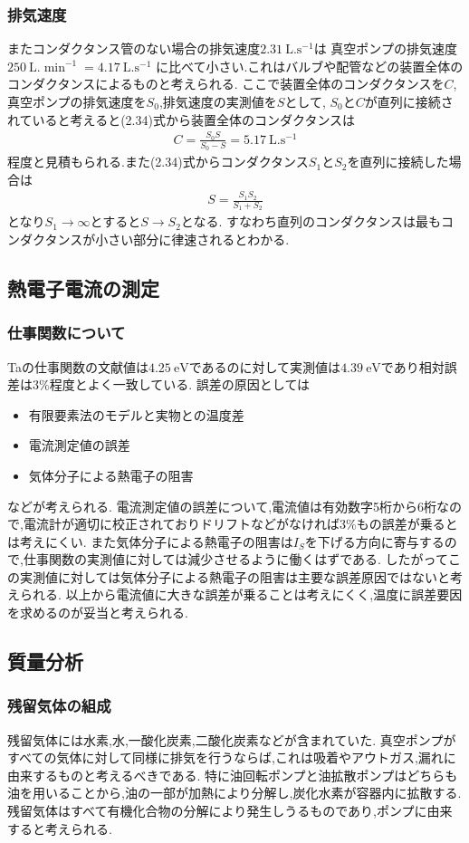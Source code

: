\subsubsection{排気速度}
またコンダクタンス管のない場合の排気速度$2.31\ \si{\liter.\second^{-1}}$は
真空ポンプの排気速度$250\ \si{\liter.\min^{-1}}=4.17\ \si{\liter.\second^{-1}}$
に比べて小さい.これはバルブや配管などの装置全体のコンダクタンスによるものと考えられる.
ここで装置全体のコンダクタンスを$C$,真空ポンプの排気速度を$S_0$,排気速度の実測値を$S$として,
$S_0$と$C$が直列に接続されていると考えると(2.34)式から装置全体のコンダクタンスは
\begin{align}
  C=\frac{S_0S}{S_0-S}=5.17\ \si{\liter.\second^{-1}}
\end{align}
程度と見積もられる.また(2.34)式からコンダクタンス$S_1$と$S_2$を直列に接続した場合は
\begin{align}
  S=\frac{S_1S_2}{S_1+S_2}
\end{align}
となり$S_1\rightarrow\infty$とすると$S\rightarrow S_2$となる.
すなわち直列のコンダクタンスは最もコンダクタンスが小さい部分に律速されるとわかる.
\subsection{熱電子電流の測定}
\subsubsection{仕事関数について}
Taの仕事関数の文献値は$4.25\ \si{\electronvolt}$であるのに対して実測値は$4.39\ \si{\electronvolt}$であり相対誤差は$3\%$程度とよく一致している.
誤差の原因としては
\begin{itemize}
  \item 有限要素法のモデルと実物との温度差
  \item 電流測定値の誤差
  \item 気体分子による熱電子の阻害
\end{itemize}
などが考えられる.
電流測定値の誤差について,電流値は有効数字5桁から6桁なので,電流計が適切に校正されておりドリフトなどがなければ$3\%$もの誤差が乗るとは考えにくい.
また気体分子による熱電子の阻害は$I_S$を下げる方向に寄与するので,仕事関数の実測値に対しては減少させるように働くはずである.
したがってこの実測値に対しては気体分子による熱電子の阻害は主要な誤差原因ではないと考えられる.
以上から電流値に大きな誤差が乗ることは考えにくく,温度に誤差要因を求めるのが妥当と考えられる.
\subsection{質量分析}
\subsubsection{残留気体の組成}
残留気体には水素,水,一酸化炭素,二酸化炭素などが含まれていた.
真空ポンプがすべての気体に対して同様に排気を行うならば,これは吸着やアウトガス,漏れに由来するものと考えるべきである.
特に油回転ポンプと油拡散ポンプはどちらも油を用いることから,油の一部が加熱により分解し,炭化水素が容器内に拡散する.\cite{pump18:online}
残留気体はすべて有機化合物の分解により発生しうるものであり,ポンプに由来すると考えられる.